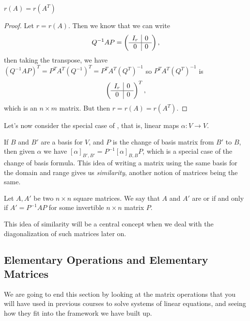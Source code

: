 \documentclass[a4paper]{scrartcl}
\begin{document}
\begin{theorem}
    $r(A) = r(A^T)$
\end{theorem}
\begin{proof}
    Let $r = r(A)$. Then we know that 
    we can write
    $$
    Q^{-1}AP = \left(\begin{array}{ c | c }
        I_r & 0 \\
        \hline
        0 & 0
      \end{array}\right),
    $$
    then taking the transpose, we have $(Q^{-1}AP)^T = P^T A^T (Q^{-1})^T = P^T A^T (Q^T)^{-1}$
    so $P^T A^T (Q^T)^{-1}$ is 
    $$
    \left(\begin{array}{ c | c }
        I_r & 0 \\
        \hline
        0 & 0
      \end{array}\right)^T,
    $$
    which is an $n \times m$ matrix. But then $r = r(A) = r(A^T)$.
\end{proof}

Let's now consider the special case of , that is, linear maps $\alpha: V \rightarrow V$.

If $B$ and $B'$ are a basis for $V$, and $P$ is the change of basis matrix from $B'$ to $B$, then given $\alpha$ we have $[\alpha]_{B', B'} = P^{-1}[\alpha]_{B, B}P$, which is a special case of the change of basis formula.
This idea of writing a matrix using the same basis for the domain and range gives us \emph{similarity}, another notion of matrices being the same.

\begin{definition}
    Let $A, A'$ be two $n \times n$ square matrices. We say that $A$ and $A'$ are  or  if and only if  $A' = P^{-1} A P$ for some invertible $n \times n$ matrix $P$.
\end{definition}

This idea of similarity will be a central concept when we deal with the diagonalization of such matrices later on.

\subsection{Elementary Operations and Elementary Matrices}

We are going to end this section by looking at the matrix operations that you will have used in previous courses to solve systems of linear equations, and seeing how they fit into the framework we have built up.
\end{document}
